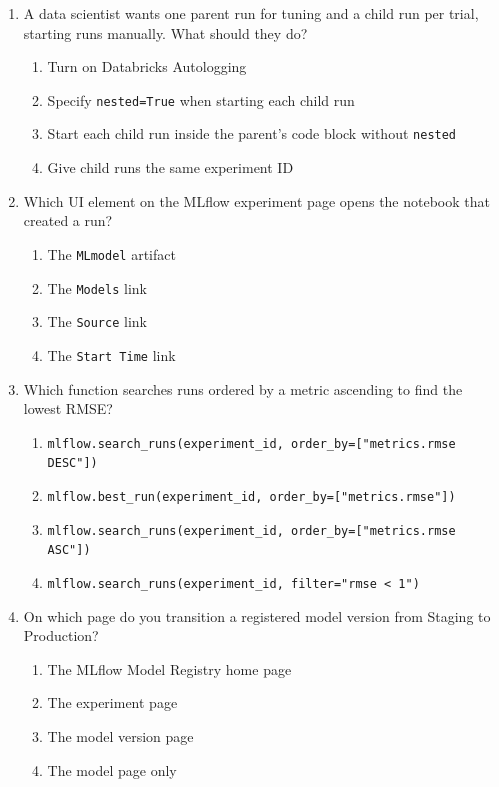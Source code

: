 \documentclass[11pt]{article}
\begin{document}
\begin{enumerate}[leftmargin=*, label=\textbf{Q\arabic*.}]
		\item A data scientist wants one parent run for tuning and a child run per trial, starting runs manually. What should they do?
		\begin{enumerate}[label=(\alph*)]
			\item Turn on Databricks Autologging
			\item Specify \texttt{nested=True} when starting each child run
			\item Start each child run inside the parent's code block without \texttt{nested}
			\item Give child runs the same experiment ID
		\end{enumerate}
		
		\item Which UI element on the MLflow experiment page opens the notebook that created a run?
		\begin{enumerate}[label=(\alph*)]
			\item The \texttt{MLmodel} artifact
			\item The \texttt{Models} link
			\item The \texttt{Source} link
			\item The \texttt{Start Time} link
		\end{enumerate}
		
		\item Which function searches runs ordered by a metric ascending to find the lowest RMSE?
		\begin{enumerate}[label=(\alph*)]
			\item \texttt{mlflow.search\_runs(experiment\_id, order\_by=["metrics.rmse DESC"])}
			\item \texttt{mlflow.best\_run(experiment\_id, order\_by=["metrics.rmse"])}
			\item \texttt{mlflow.search\_runs(experiment\_id, order\_by=["metrics.rmse ASC"])}
			\item \texttt{mlflow.search\_runs(experiment\_id, filter="rmse < 1")}
		\end{enumerate}
		
		\item On which page do you transition a registered model version from Staging to Production?
		\begin{enumerate}[label=(\alph*)]
			\item The MLflow Model Registry home page
			\item The experiment page
			\item The model version page
			\item The model page only
		\end{enumerate}
		

\end{enumerate}
\end{document}

